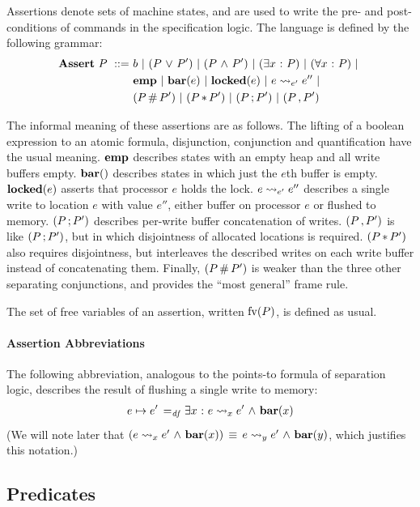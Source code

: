 \documentclass[11pt]{article}
\begin{document}
Assertions denote sets of machine states, and are used to write the pre- and post-conditions of commands in the specification logic. The language is defined by the following grammar: \begin{align*}
	\mathbf{Assert}~P ~::=~ & b ~|~ (P \operatorname{\,\vee\,} P') ~|~ (P \operatorname{\,\wedge\,} P') ~|~ (\exists x \operatorname{\,:\,} P) ~|~ (\forall x \operatorname{\,:\,} P) ~|~ \\
	& \mathbf{emp} ~|~ \mathbf{bar}(e) ~|~ \mathbf{locked}(e) ~|~ e \leadsto_{e'} e'' ~|~  \\ 
	& (P \operatorname{\#} P') ~|~ (P \operatorname{\ast} P') ~|~ (P \operatorname{;} P') ~|~ (P \operatorname{,} P')
\end{align*} 

The informal meaning of these assertions are as follows. The lifting of a boolean expression to an atomic formula, disjunction, conjunction and quantification have the usual meaning. $\mathbf{emp}$ describes states with an empty heap and all write buffers empty. $\fbar$ describes states in which just the $e$th buffer is empty. $\mathbf{locked}(e)$ asserts that processor $e$ holds the lock. $e \leadsto_{e'} e''$ describes a single write to location $e$ with value $e''$, either buffer on processor $e$ or flushed to memory. $(P \operatorname{;} P')$ describes per-write buffer concatenation of writes. $(P \operatorname{,} P')$ is like $(P \operatorname{;} P')$, but in which disjointness of allocated locations is required. $(P \operatorname{\ast} P')$ also requires disjointness, but interleaves the described writes on each write buffer instead of concatenating them. Finally, $(P \operatorname{\#} P')$ is weaker than the three other separating conjunctions, and provides the ``most general'' frame rule. 

The set of free variables of an assertion, written $\mathrm{fv}(P)$, is defined as usual. 

\paragraph{Assertion Abbreviations} The following abbreviation, analogous to the points-to formula of separation logic, describes the result of flushing a single write to memory: \begin{align*}
	e \mapsto e' \operatorname{\;=_{\mathit{df}}\;} & \exists x \operatorname{\,:\,} e \leadsto_{x} e' \operatorname{\,\wedge\,} \mathbf{bar}(x)\\
\end{align*} (We will note later that $(e \leadsto_{x} e' \operatorname{\,\wedge\,} \mathbf{bar}(x))\,\equiv\, e \leadsto_{y} e' \operatorname{\,\wedge\,} \mathbf{bar}(y)$, which justifies this notation.) 

\subsection{Predicates}
\label{sec:predicates}
\end{document}
